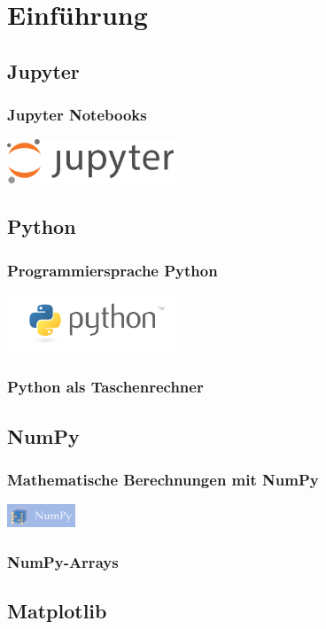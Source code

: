 \documentclass{beamer}
\begin{document}
\section{Einf\"uhrung}

\subsection{Jupyter}

\begin{frame}
  \frametitle{Jupyter Notebooks}
  \includegraphics[width=2in]{jupyter-logo.png}
\end{frame}

\subsection{Python}

\begin{frame}
  \frametitle{Programmiersprache Python}
  \includegraphics[width=2in]{python-logo.png}
\end{frame}

\begin{frame}
  \frametitle{Python als Taschenrechner}
\end{frame}


\subsection{NumPy}

\begin{frame}
  \frametitle{Mathematische Berechnungen mit NumPy}
  \includegraphics[width=0.8in]{numpy-logo.png}
\end{frame}

\begin{frame}
  \frametitle{NumPy-Arrays}
\end{frame}


\subsection{Matplotlib}
\end{document}
